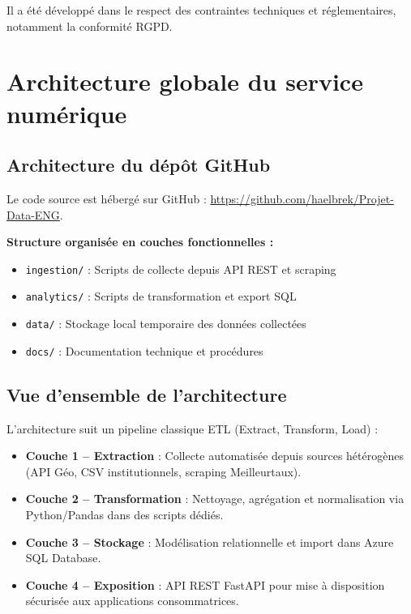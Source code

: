 \documentclass[12pt,a4paper]{article}
\begin{document}
Il a été développé dans le respect des contraintes techniques et réglementaires, notamment la conformité RGPD.

\section{Architecture globale du service numérique}
\subsection{Architecture du dépôt GitHub}

Le code source est hébergé sur GitHub : \url{https://github.com/haelbrek/Projet-Data-ENG}.




\textbf{Structure organisée en couches fonctionnelles :}
\begin{itemize}
    \item \texttt{ingestion/} : Scripts de collecte depuis API REST et scraping
    \item \texttt{analytics/} : Scripts de transformation et export SQL
    \item \texttt{data/} : Stockage local temporaire des données collectées
    \item \texttt{docs/} : Documentation technique et procédures
\end{itemize}


\subsection{Vue d'ensemble de l'architecture}

L'architecture suit un pipeline classique ETL (Extract, Transform, Load) :

\begin{itemize}
    \item \textbf{Couche 1 -- Extraction} : Collecte automatisée depuis sources hétérogènes (API Géo, CSV institutionnels, scraping Meilleurtaux).
    \item \textbf{Couche 2 -- Transformation} : Nettoyage, agrégation et normalisation via Python/Pandas dans des scripts dédiés.
    \item \textbf{Couche 3 -- Stockage} : Modélisation relationnelle et import dans Azure SQL Database.
    \item \textbf{Couche 4 -- Exposition} : API REST FastAPI pour mise à disposition sécurisée aux applications consommatrices.
\end{itemize}
\end{document}
